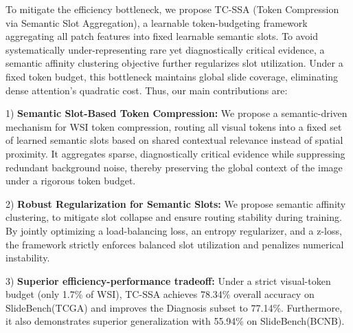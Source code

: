 \documentclass[runningheads]{llncs}
\begin{document}
To mitigate the efficiency bottleneck, we propose \textsc{TC-SSA} (Token Compression via Semantic Slot Aggregation), a learnable token-budgeting framework aggregating all patch features into fixed learnable semantic slots. To avoid systematically under-representing rare yet diagnostically critical evidence, a semantic affinity clustering objective further regularizes slot utilization. Under a fixed token budget, this bottleneck maintains global slide coverage, eliminating dense attention's quadratic cost.
Thus, our main contributions are:

1) \textbf{Semantic Slot-Based Token Compression:} We propose a semantic-driven mechanism for WSI token compression, routing all visual tokens into a fixed set of learned semantic slots based on shared contextual relevance instead of spatial proximity. It aggregates sparse, diagnostically critical evidence while suppressing redundant background noise, thereby preserving the global context of the image under a rigorous token budget.

2) \textbf{Robust Regularization for Semantic Slots:} We propose semantic affinity clustering, to mitigate slot collapse and ensure routing stability during training. By jointly optimizing a load-balancing loss, an entropy regularizer, and a z-loss, the framework strictly enforces balanced slot utilization and penalizes numerical instability. 

3) \textbf{Superior efficiency-performance tradeoff:} Under a strict visual-token budget (only 1.7\% of WSI), \textsc{TC-SSA} achieves 78.34\% overall accuracy on SlideBench(TCGA) and improves the Diagnosis subset to 77.14\%. Furthermore, it also demonstrates superior generalization with 55.94\% on  SlideBench(BCNB). 
    


    
\end{document}
